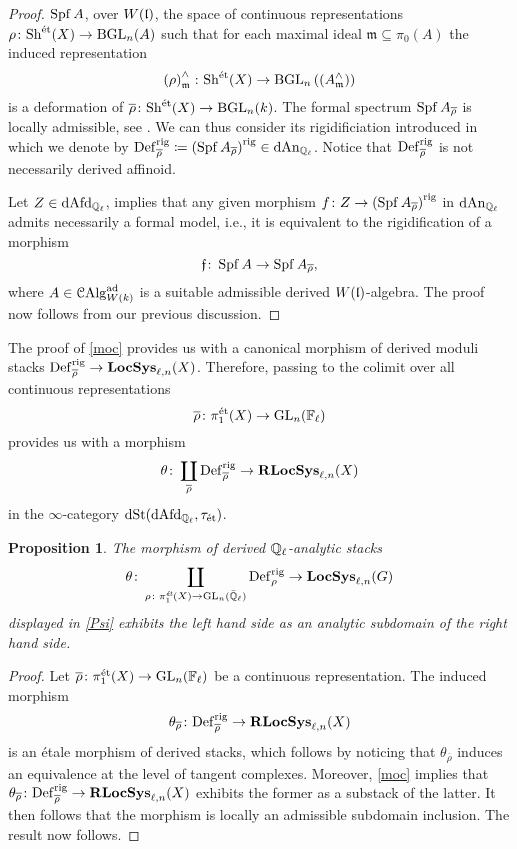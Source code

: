 \documentclass[10pt,a4paper]{amsart}
\numberwithin{equation}{subsection}
\theoremstyle{plain}
\newtheorem{prop}[theorem]{Proposition}
\theoremstyle{definition}
\theoremstyle{remark}
\numberwithin{equation}{section}
\begin{document}
\begin{proof}
$\operatorname{Spf} A$, over $W(\mathfrak l)$, the space of continuous representations $ \rho \colon \mathrm{Sh}^{\text{\'et}}(X) \to \mathrm B \mathrm{GL}_n(A)$ such that for each maximal ideal $\mathfrak m \subseteq \pi_0(A)$ the induced representation 
	\[
		\left( \rho \right)^\wedge_{\mathfrak{m}} \colon \mathrm{Sh}^{\text{\'et}}(X) \to \mathrm B \mathrm{GL}_n \left( \left( A^\wedge_{\mathfrak{m}} \right) \right)
	\]
is a deformation of $\overline{\rho} \colon \mathrm{Sh}^{\text{\'et}}(X) \to \mathrm B \mathrm{GL}_n(k)$. The formal spectrum $\operatorname{Spf} A_{\overline{\rho}}$ is locally admissible, see \cite[Definition 3.1.1]{me2}. We can thus consider its rigidificiation introduced in
\cite[Proposition 3.1.2]{me2} which we denote by $\mathbf{\mathrm{Def}}^{\mathrm{rig}}_{\overline{\rho}}
\coloneqq \left( \operatorname{Spf} A_{\overline{\rho}} \right)^{\mathrm{rig}} \in \mathrm{dAn}_{\mathbb{Q}_\ell}$. Notice that
$\mathbf{\mathrm{Def}}^{\mathrm{rig}}_{\overline{\rho}}$ is not necessarily derived affinoid. 

Let $Z \in \mathrm{dAfd}_{\mathbb{Q}_\ell}$, \cite[Corollary 4.4.13]{me2} implies that any given morphism $ f \colon Z \to \left( \operatorname{Spf} A_{\overline{\rho}} \right)^{\mathrm{rig}}$ in $\mathrm{dAn}_{\mathbb{Q}_\ell}$ admits necessarily a formal model, i.e., it is equivalent to the rigidification of a morphism
	\[
		\mathfrak f \colon \operatorname{Spf} A \to \operatorname{Spf} A_{\overline{\rho}},
	\]
where $A  \in \mathcal{C}\mathrm{Alg}_{W(k)}^{\mathrm{ad}}$ is a suitable admissible derived $W(\mathfrak l)$-algebra. The proof now follows from our previous discussion.
\end{proof}


The proof of \cref{moc} provides us with a canonical morphism of derived moduli stacks $\mathbf{\mathrm{Def}}^{\mathrm{rig}}_{\overline{\rho}} \to \mathbf{LocSys}_{\ell, n}(X)$. Therefore, passing to the colimit over all continuous representations
	\[
		\overline{\rho} \colon \pi_1^{\text{\'et}}(X) \to \mathrm{GL}_n(\mathbb F_\ell)
	\]
provides us with a morphism 
	\begin{equation} \label{Psi}
		\theta   \colon
															\coprod_{\overline{\rho} } \mathbf{\mathrm{Def}}_{\overline{\rho} }^{\mathrm{rig}}
																\to
																															\mathbf R \mathbf{LocSys}_{\ell, n}(X)							
	\end{equation}
in the $\infty$-category $\mathrm{dSt}(\mathrm{dAfd}_{\mathbb{Q}_\ell}, \tau_{\text{\'et}})$.


\begin{prop} \label{open_im}
The morphism of derived $\mathbb{Q}_\ell$-analytic stacks 
	\[
		\theta \colon \coprod_{\rho \colon \pi_1^{\emph{\text{\'et}}}(X) \to \mathrm{GL}_n(\bar{\mathbb{Q}}_{\ell}) } \mathbf{\mathrm{Def}}_{\rho}^{\mathrm{rig}} \to \mathbf{LocSys}_{\ell, n}(G)
	\]
displayed in \eqref{Psi} exhibits the left hand side as an analytic subdomain of the right hand side.
\end{prop}

\begin{proof}
Let $\overline{\rho} \colon \pi_1^{\text{\'et}}(X) \to \mathrm{GL}_n( \mathbb F_\ell)$ be a continuous representation. The induced morphism
	\[
		\theta_{\overline{\rho}} \colon \mathbf{\mathrm{Def}}^{\mathrm{rig}}_{\overline{\rho}} \to \mathbf R \mathbf{LocSys}_{\ell, n}(X)
	\]
is an \'etale morphism of derived stacks, which follows by noticing
that $\theta_{\overline{\rho}}$ induces an equivalence at the level of tangent complexes. Moreover, \cref{moc} implies that $ \theta_{\overline{\rho}} \colon \mathbf{\mathrm{Def}}^{\mathrm{rig}}_{\overline{\rho}} \to \mathbf R \mathbf{LocSys}_{\ell, n}(X)$ exhibits the former as a substack of the latter.
It then follows that the morphism is locally an admissible subdomain inclusion. The result now follows.
\end{proof} 
\end{document}
